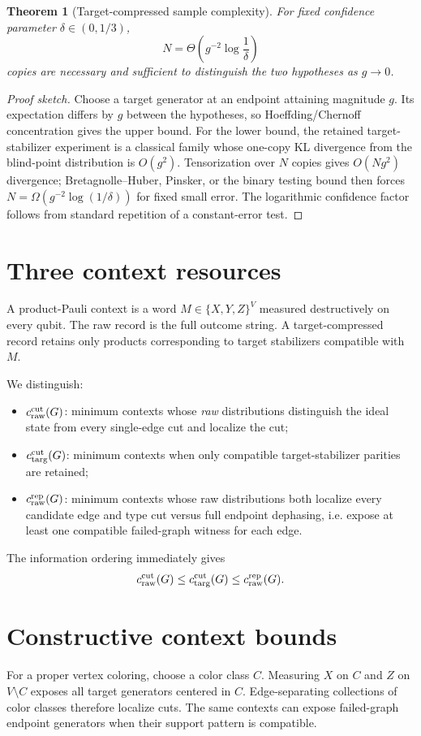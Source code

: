\documentclass[11pt]{article}
\newtheorem{theorem}{Theorem}[section]
\newcommand{\ccutraw}{c_{\rm raw}^{\rm cut}}
\newcommand{\cdiag}{c_{\rm targ}^{\rm cut}}
\newcommand{\crep}{c_{\rm raw}^{\rm rep}}
\begin{document}
\begin{theorem}[Target-compressed sample complexity]
For fixed confidence parameter $\delta\in(0,1/3)$,
\[
N=\Theta\!\left(g^{-2}\log\frac1\delta\right)
\]
copies are necessary and sufficient to distinguish the two hypotheses as $g\to0$.
\end{theorem}
\begin{proof}[Proof sketch]
Choose a target generator at an endpoint attaining magnitude $g$. Its expectation differs by $g$ between the hypotheses, so Hoeffding/Chernoff concentration gives the upper bound. For the lower bound, the retained target-stabilizer experiment is a classical family whose one-copy KL divergence from the blind-point distribution is $O(g^2)$. Tensorization over $N$ copies gives $O(Ng^2)$ divergence; Bretagnolle--Huber, Pinsker, or the binary testing bound then forces $N=\Omega(g^{-2}\log(1/\delta))$ for fixed small error. The logarithmic confidence factor follows from standard repetition of a constant-error test.
\end{proof}

\section{Three context resources}
A product-Pauli context is a word $M\in\{X,Y,Z\}^V$ measured destructively on every qubit. The raw record is the full outcome string. A target-compressed record retains only products corresponding to target stabilizers compatible with $M$.

We distinguish:
\begin{itemize}[leftmargin=1.6em]
\item $\ccutraw(G)$: minimum contexts whose \emph{raw} distributions distinguish the ideal state from every single-edge cut and localize the cut;
\item $\cdiag(G)$: minimum contexts when only compatible target-stabilizer parities are retained;
\item $\crep(G)$: minimum contexts whose raw distributions both localize every candidate edge and type cut versus full endpoint dephasing, i.e. expose at least one compatible failed-graph witness for each edge.
\end{itemize}
The information ordering immediately gives
\[
\ccutraw(G)\le \cdiag(G)\le \crep(G).
\]

\section{Constructive context bounds}
For a proper vertex coloring, choose a color class $C$. Measuring $X$ on $C$ and $Z$ on $V\setminus C$ exposes all target generators centered in $C$. Edge-separating collections of color classes therefore localize cuts. The same contexts can expose failed-graph endpoint generators when their support pattern is compatible.
\end{document}
